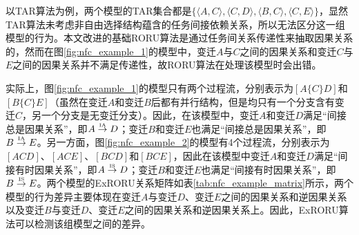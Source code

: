 以TAR算法为例，两个模型的TAR集合都是$\{\langle A,C\rangle,\langle C,D\rangle,\langle B,C\rangle,\langle C,E\rangle\}$，显然TAR算法未考虑非自由选择结构蕴含的任务间接依赖关系，所以无法区分这一组模型的行为。本文改进的基础RORU算法是通过任务间关系传递性来抽取因果关系的，然而在图\ref{fig:nfc_example_1}的模型中，变迁$A$与$C$之间的因果关系和变迁$C$与$E$之间的因果关系并不满足传递性，故RORU算法在处理该模型时会出错。

实际上，图\ref{fig:nfc_example_1}的模型只有两个过程流，分别表示为$[A\{C\}D]$和$[B\{C\}E]$（虽然在变迁$A$和变迁$B$后都有并行结构，但是均只有一个分支含有变迁$C$，另一个分支是无变迁分支）。因此，在该模型中，变迁$A$和变迁$D$满足“间接总是因果关系”，即$A\overset{\text{\tiny{IA}}}{\rightarrow}D$；变迁$B$和变迁$E$也满足“间接总是因果关系”，即$B\overset{\text{\tiny{IA}}}{\rightarrow}E$。另一方面，图\ref{fig:nfc_example_2}的模型有4个过程流，分别表示为$[ACD]$、$[ACE]$、$[BCD]$和$[BCE]$，因此在该模型中变迁$A$和变迁$D$满足“间接有时因果关系”，即$A\overset{\text{\tiny{IS}}}{\rightarrow}D$；变迁$B$和变迁$E$也满足“间接有时因果关系”，即$B\overset{\text{\tiny{IS}}}{\rightarrow}E$。两个模型的ExRORU关系矩阵如表\ref{tab:nfc_example_matrix}所示，两个模型的行为差异主要体现在变迁$A$与变迁$D$、变迁$E$之间的因果关系和逆因果关系以及变迁$B$与变迁$D$、变迁$E$之间的因果关系和逆因果关系上。因此，ExRORU算法可以检测该组模型之间的差异。

